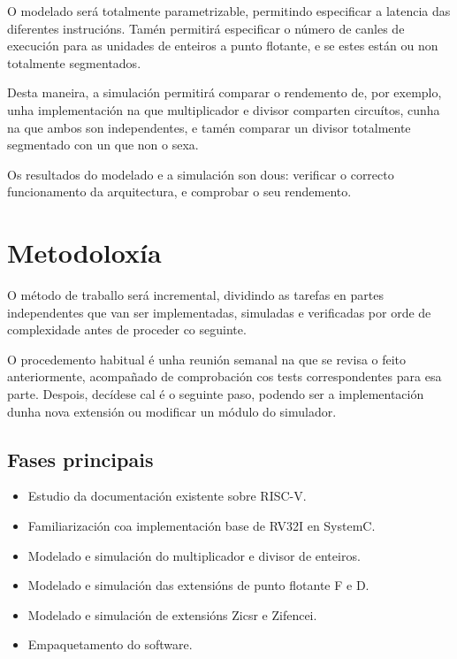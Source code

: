 O modelado será totalmente parametrizable, permitindo especificar a latencia das diferentes instrucións. Tamén permitirá especificar o número de canles de execución para as unidades de enteiros a punto flotante, e se estes están ou non totalmente segmentados. 

Desta maneira, a simulación permitirá comparar o rendemento de, por exemplo, unha implementación na que multiplicador e divisor comparten circuítos, cunha na que ambos son independentes, e tamén comparar un divisor totalmente segmentado con un que non o sexa. 

Os resultados do modelado e a simulación son dous: verificar o correcto funcionamento da arquitectura, e comprobar o seu rendemento. 


\section{Metodoloxía}
\label{sec:metodoloxía}
O método de traballo será incremental, dividindo as tarefas en partes independentes que van ser implementadas, simuladas e verificadas por orde de complexidade antes de proceder co seguinte.

O procedemento habitual é unha reunión semanal na que se revisa o feito anteriormente, acompañado de comprobación cos tests correspondentes para esa parte. Despois, decídese cal é o seguinte paso, podendo ser a implementación dunha nova extensión ou modificar un módulo do simulador.

\subsection{Fases principais}
\begin{itemize}
    \item Estudio da documentación existente sobre RISC-V.
    \item Familiarización coa implementación base de RV32I en SystemC. 
    \item Modelado e simulación do multiplicador e divisor de enteiros. 
    \item Modelado e simulación das extensións de punto flotante F e D. 
    \item Modelado e simulación de extensións Zicsr e  Zifencei.
    \item Empaquetamento do software. 

\end{itemize}

